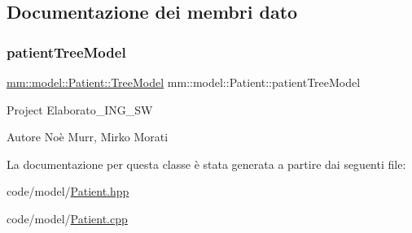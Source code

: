 \subsection{Documentazione dei membri dato}
\mbox{\label{classmm_1_1model_1_1_patient_af2fe625b7bf2e3308df51daaff966281}} 
\subsubsection{\texorpdfstring{patient\+Tree\+Model}{patientTreeModel}}
{\footnotesize\ttfamily \hyperlink{structmm_1_1model_1_1_patient_1_1_tree_model}{mm\+::model\+::\+Patient\+::\+Tree\+Model} mm\+::model\+::\+Patient\+::patient\+Tree\+Model\hspace{0.3cm}{\ttfamily [static]}}

Project Elaborato\+\_\+\+I\+N\+G\+\_\+\+SW \begin{DoxyAuthor}{Autore}
Noè Murr, Mirko Morati 
\end{DoxyAuthor}


La documentazione per questa classe è stata generata a partire dai seguenti file\+:\begin{DoxyCompactItemize}
\item 
code/model/\hyperlink{_patient_8hpp}{Patient.\+hpp}\item 
code/model/\hyperlink{_patient_8cpp}{Patient.\+cpp}\end{DoxyCompactItemize}
